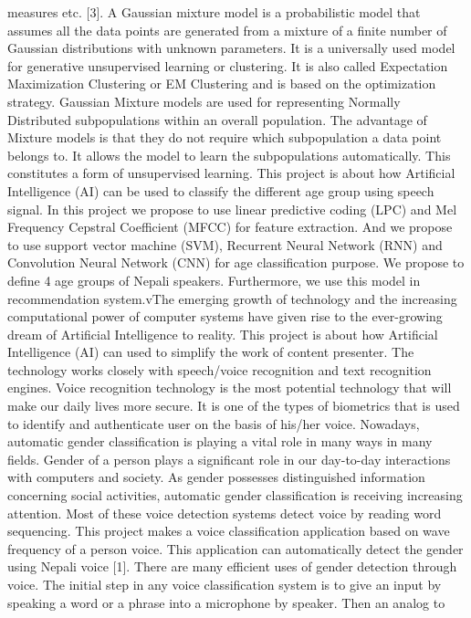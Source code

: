 \documentclass[a4paper,12pt]{article}
\begin{document}
{measures etc. [3]. A Gaussian mixture model is a probabilistic model that assumes all the data
points are generated from a mixture of a finite number of Gaussian distributions with unknown
parameters. It is a universally used model for generative unsupervised learning or clustering. It
is also called Expectation Maximization Clustering or EM Clustering and is based on the
optimization strategy. Gaussian Mixture models are used for representing Normally
Distributed subpopulations within an overall population. The advantage of Mixture models is
that they do not require which subpopulation a data point belongs to. It allows the model to
learn the subpopulations automatically. This constitutes a form of unsupervised learning.
This project is about how Artificial Intelligence (AI) can be used to classify the different age
group using speech signal. In this project we propose to use linear predictive coding (LPC) and
Mel Frequency Cepstral Coefficient (MFCC) for feature extraction. And we propose to use
support vector machine (SVM), Recurrent Neural Network (RNN) and Convolution Neural
Network (CNN) for age classification purpose. We propose to define 4 age groups of Nepali
speakers. Furthermore, we use this model in recommendation system.vThe emerging growth of technology and the increasing computational power of computer
systems have given rise to the ever-growing dream of Artificial Intelligence to reality. This
project is about how Artificial Intelligence (AI) can used to simplify the work of content
presenter. The technology works closely with speech/voice recognition and text recognition
engines. Voice recognition technology is the most potential technology that will make our daily
lives more secure. It is one of the types of biometrics that is used to identify and authenticate
user on the basis of his/her voice. Nowadays, automatic gender classification is playing a vital
role in many ways in many fields. Gender of a person plays a significant role in our day-to-day
interactions with computers and society. As gender possesses distinguished information
concerning social activities, automatic gender classification is receiving increasing attention.
Most of these voice detection systems detect voice by reading word sequencing. This project
makes a voice classification application based on wave frequency of a person voice. This
application can automatically detect the gender using Nepali voice [1]. There are many efficient
uses of gender detection through voice. The initial step in any voice classification system is to
give an input by speaking a word or a phrase into a microphone by speaker. Then an analog to
}
\end{document}
